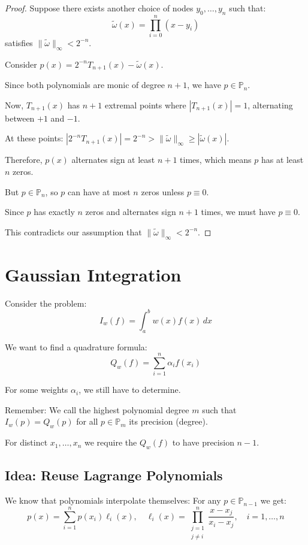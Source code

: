 \begin{proof}
    Suppose there exists another choice of nodes $y_0, \ldots, y_n$ such that:
    \[\tilde{\omega}(x) = \prod_{i=0}^n (x - y_i)\]
    satisfies $\|\tilde{\omega}\|_{\infty} < 2^{-n}$.

    Consider $p(x) = 2^{-n}T_{n+1}(x) - \tilde{\omega}(x)$.

    Since both polynomials are monic of degree $n+1$, we have $p \in \mathbb{P}_n$.

    Now, $T_{n+1}(x)$ has $n+1$ extremal points where $|T_{n+1}(x)| = 1$, alternating between $+1$ and $-1$.

    At these points: $|2^{-n}T_{n+1}(x)| = 2^{-n} > \|\tilde{\omega}\|_{\infty} \geq |\tilde{\omega}(x)|$.

    Therefore, $p(x)$ alternates sign at least $n+1$ times, which means $p$ has at least $n$ zeros.

    But $p \in \mathbb{P}_n$, so $p$ can have at most $n$ zeros unless $p \equiv 0$.

    Since $p$ has exactly $n$ zeros and alternates sign $n+1$ times, we must have $p \equiv 0$.

    This contradicts our assumption that $\|\tilde{\omega}\|_{\infty} < 2^{-n}$.
\end{proof}

\section{Gaussian Integration}

Consider the problem:
\[I_w(f) = \int_a^b w(x)f(x) \, dx\]

We want to find a quadrature formula:
\[Q_w(f) = \sum_{i=1}^n \alpha_i f(x_i)\]

For some weights $\alpha_i$, we still have to determine.

Remember: We call the highest polynomial degree $m$ such that $I_w(p) = Q_w(p)$ for all $p \in \mathbb{P}_m$ its precision (degree).

For distinct $x_1, \ldots, x_n$ we require the $Q_w(f)$ to have precision $n-1$.

\subsection{Idea: Reuse Lagrange Polynomials}

We know that polynomials interpolate themselves: For any $p \in \mathbb{P}_{n-1}$ we get:
\[p(x) = \sum_{i=1}^n p(x_i) \ell_i(x), \quad \ell_i(x) = \prod_{\substack{j=1\\j \neq i}}^n \frac{x - x_j}{x_i - x_j}, \quad i = 1, \ldots, n\]


